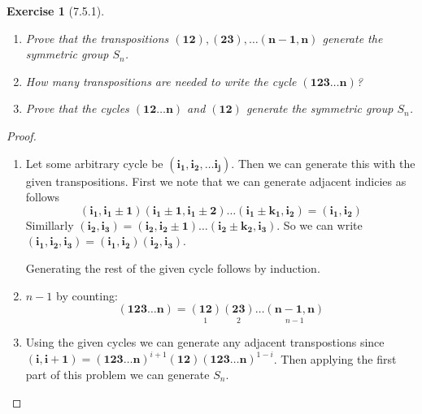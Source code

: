 \documentclass[12pt]{article}
\newtheorem*{exer}{Exercise}
\newcommand{\cycle}[1]{(\mathbf{#1})}
\begin{document}
\begin{exer}[7.5.1]

    \begin{enumerate}
        \item Prove that the transpositions $\cycle{12}, \cycle{23},
            \dots \cycle{n - 1, n}$ generate the symmetric group $S_n$. 

        \item How many transpositions are needed to write the cycle
            $\cycle{123 \dots n}$?

        \item Prove that the cycles $\cycle{12 \dots n}$ and
            $\cycle{12}$ generate the symmetric group $S_n$.
    \end{enumerate}

\end{exer}

\begin{proof}

    \begin{enumerate}
        \item Let some arbitrary cycle be $\cycle{i_1, i_2, \dots i_j}$.
            Then we can generate this with the given transpositions.
            First we note that we can generate adjacent indicies as
            follows
            \[
                \cycle{i_1, i_1 \pm 1} \cycle{i_1 \pm 1, i_1 \pm 2}
                \dots \cycle{i_1 \pm k_1, i_2} = \cycle{i_1, i_2}
            \]
            Simillarly $\cycle{i_2, i_3} = \cycle{i_2, i_2 \pm 1}
            \dots \cycle{i_2 \pm k_2, i_3}$. So we can write
            $\cycle{i_1, i_2, i_3} = \cycle{i_1, i_2} \cycle{i_2, i_3}$.

            Generating the rest of the given cycle follows by induction.

        \item $n - 1$ by counting: 
            \[
                \cycle{123 \dots n} = \underset{1}{\cycle{12}}
                \underset{2}{\cycle{23}} \dots \underset{n-1}{\cycle{n-1,
                n}}
            \]

        \item Using the given cycles we can generate any adjacent
            transpostions since  $\cycle{i, i+1} = \cycle{123 \dots
            n}^{i+1} \cycle{12} \cycle{123 \dots n}^{1-i}$. Then
            applying the first part of this problem we can generate
            $S_n$.

    \end{enumerate}

\end{proof}

\end{document}
